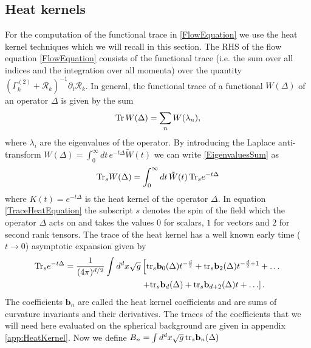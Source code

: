 \documentclass[notitlepage,eqsecnum,bm,amsmath,preprintnumbers,superscriptaddress,nofootinbib,aps,11pt]{revtex4-1}
\begin{document}
\subsection{Heat kernels}\label{sec:heat}
For the computation of the functional trace in \eqref{FlowEquation} we use the heat kernel techniques 
\cite{Avramidi:2000bm,Gilkey:1995mj} which we will recall in this section. 
The RHS of the flow equation \eqref{FlowEquation} consists of the functional trace (i.e. the sum over 
all indices and the integration over all momenta) over the quantity 
$(\Gamma_k^{(2)}+\mathcal R_k)^{-1}\partial_t \mathcal R_k$. 
In general, the functional trace of a functional $W(\Delta)$ of an operator $\Delta$ is given by the sum 
\begin{equation}
\textnormal{Tr} \,W(\Delta)=\sum_nW(\lambda_n), \label{EigenvaluesSum}
\end{equation} 
where $\lambda_i$ are the eigenvalues of the operator. By introducing the Laplace anti-transform 
$W(\Delta)=\int_0^\infty dt \,e^{- t \Delta} \tilde W(t)$
we can write \eqref{EigenvaluesSum} as
\begin{equation}
\textnormal{Tr}_sW(\Delta)=\int_0^{\infty}dt\,\tilde W(t)\,\textnormal{Tr}_se^{-t\Delta} \label{TraceHeatEquation}
\end{equation}
where  $K(t)=e^{-t\Delta}$ is the heat kernel of the operator $\Delta$. In equation \eqref{TraceHeatEquation} the 
subscript $s$ denotes the spin of the field which the operator $\Delta$ acts on and takes the values $0$ for scalars, $1$ for 
vectors and $2$ for second rank tensors. The trace of the heat kernel has a well known early time ($t\to0$) asymptotic expansion given by \cite{Avramidi:2000bm}
\begin{equation}
\begin{split}
\textnormal{Tr}_se^{-t\Delta}=\frac{1}{(4\pi)^{d/2}}\int d^dx\sqrt{g}&\left[\textnormal{tr}_s\mathbf{b}_0(\Delta)t^{-\frac{d}{2}}+\textnormal{tr}_s\mathbf{b}_2(\Delta)t^{-\frac{d}{2}+1}+\ldots\right.\\
&\left.+\textnormal{tr}_s\mathbf{b}_d(\Delta)+\textnormal{tr}_s\mathbf{b}_{d+2}(\Delta)t+\ldots\right]. \label{HKbexpansion}
\end{split}
\end{equation}
The coefficients $\mathbf{b}_n$ are called the heat kernel coefficients and 
 are sums of curvature invariants and their derivatives. 
The traces of the  coefficients that we will need here evaluated on the spherical background
are given in appendix \ref{app:HeatKernel}. Now we define $B_n=\int d^dx\sqrt{g}\,\textnormal{tr}_s\mathbf{b}_n(\Delta)$ 
\end{document}
